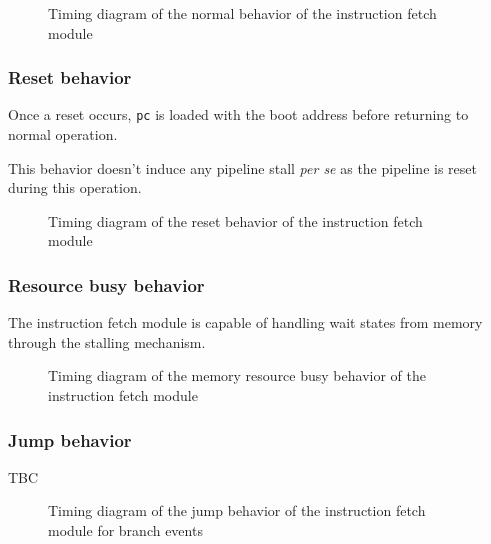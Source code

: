 \begin{figure}[H]
    \centering
    
    \caption{Timing diagram of the normal behavior of the instruction fetch module}
    \label{fig:ifm-behavior-normal}
\end{figure}

\subsubsection{Reset behavior}

\begin{content}
  Once a reset occurs, \texttt{pc} is loaded with the boot address before returning to normal operation.

  This behavior doesn't induce any pipeline stall \textit{per se} as the pipeline is reset during this operation.
\end{content}

\begin{figure}[H]
    \centering
    
    \caption{Timing diagram of the reset behavior of the instruction fetch module}
    \label{fig:ifm-behavior-reset}
\end{figure}

\subsubsection{Resource busy behavior}

\begin{content}
  The instruction fetch module is capable of handling wait states from memory through the stalling mechanism.
\end{content}

\begin{figure}[H]
    \centering
    
    \caption{Timing diagram of the memory resource busy behavior of the instruction fetch module}
    \label{fig:ifm-behavior-wait}
\end{figure}

\subsubsection{Jump behavior}

\begin{content}
  TBC
\end{content}

\begin{figure}[H]
    \centering
    
    \caption{Timing diagram of the jump behavior of the instruction fetch module for branch events}
    \label{fig:ifm-behavior-branch}
\end{figure}

